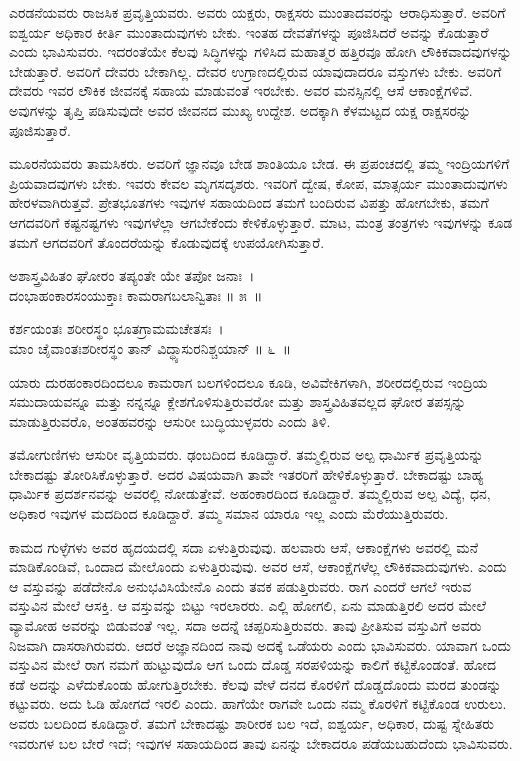ಎರಡನೆಯವರು ರಾಜಸಿಕ ಪ್ರವೃತ್ತಿಯವರು. ಅವರು ಯಕ್ಷರು, ರಾಕ್ಷಸರು ಮುಂತಾದವ\-ರನ್ನು ಆರಾಧಿಸುತ್ತಾರೆ. ಅವರಿಗೆ ಐಶ್ವರ್ಯ ಅಧಿಕಾರ ಕೀರ್ತಿ ಮುಂತಾದುವುಗಳು ಬೇಕು. ಇಂತಹ ದೇವತೆಗಳನ್ನು ಪೂಜಿಸಿದರೆ ಅವನ್ನು ಕೊಡುತ್ತಾರೆ ಎಂದು ಭಾವಿಸುವರು. ಇದರಂತೆಯೇ ಕೆಲವು ಸಿದ್ಧಿಗಳನ್ನು ಗಳಿಸಿದ ಮಹಾತ್ಮರ ಹತ್ತಿರವೂ ಹೋಗಿ ಲೌಕಿಕವಾದವುಗಳನ್ನು ಬೇಡುತ್ತಾರೆ. ಅವರಿಗೆ ದೇವರು ಬೇಕಾಗಿಲ್ಲ. ದೇವರ ಉಗ್ರಾಣದಲ್ಲಿರುವ ಯಾವುದಾದರೂ ವಸ್ತುಗಳು ಬೇಕು. ಅವರಿಗೆ ದೇವರು ಇವರ ಲೌಕಿಕ ಜೀವನಕ್ಕೆ ಸಹಾಯ ಮಾಡುವಂತೆ ಇರಬೇಕು. ಅವರ ಮನಸ್ಸಿನಲ್ಲಿ ಆಸೆ ಆಕಾಂಕ್ಷೆಗಳಿವೆ. ಅವುಗಳನ್ನು ತೃಪ್ತಿ ಪಡಿಸುವುದೇ ಅವರ ಜೀವನದ ಮುಖ್ಯ ಉದ್ದೇಶ. ಅದಕ್ಕಾಗಿ ಕೆಳಮಟ್ಟದ ಯಕ್ಷ ರಾಕ್ಷಸರನ್ನು ಪೂಜಿಸುತ್ತಾರೆ.

ಮೂರನೆಯವರು ತಾಮಸಿಕರು. ಅವರಿಗೆ ಜ್ಞಾನವೂ ಬೇಡ ಶಾಂತಿಯೂ ಬೇಡ. ಈ ಪ್ರಪಂಚದಲ್ಲಿ ತಮ್ಮ ಇಂದ್ರಿಯಗಳಿಗೆ ಪ್ರಿಯವಾದವುಗಳು ಬೇಕು. ಇವರು ಕೇವಲ ಮೃಗಸದೃಶರು. ಇವರಿಗೆ ದ್ವೇಷ, ಕೋಪ, ಮಾತ್ಸರ್ಯ ಮುಂತಾದುವುಗಳು ಹೇರಳವಾಗಿರುತ್ತವೆ. ಪ್ರೇತಭೂತಗಳು ಇವುಗಳ ಸಹಾಯದಿಂದ ತಮಗೆ ಬಂದಿರುವ ವಿಪತ್ತು ಹೋಗಬೇಕು, ತಮಗೆ ಆಗದವರಿಗೆ ಕಷ್ಟನಷ್ಟಗಳು ಇವುಗಳೆಲ್ಲಾ ಆಗಬೇಕೆಂದು ಕೇಳಿಕೊಳ್ಳುತ್ತಾರೆ. ಮಾಟ, ಮಂತ್ರ ತಂತ್ರಗಳು ಇವುಗಳನ್ನು ಕೂಡ ತಮಗೆ ಆಗದವರಿಗೆ ತೊಂದರೆಯನ್ನು ಕೊಡುವುದಕ್ಕೆ ಉಪಯೋಗಿಸುತ್ತಾರೆ.

\begin{shloka}
ಅಶಾಸ್ತ್ರವಿಹಿತಂ ಘೋರಂ ತಪ್ಯಂತೇ ಯೇ ತಪೋ ಜನಾಃ~।\\ದಂಭಾಹಂಕಾರಸಂಯುಕ್ತಾಃ ಕಾಮರಾಗಬಲಾನ್ವಿತಾಃ \hfill॥ ೫~॥
\end{shloka}

\begin{shloka}
ಕರ್ಶಯಂತಃ ಶರೀರಸ್ಥಂ ಭೂತಗ್ರಾಮಮಚೇತಸಃ~।\\ಮಾಂ ಚೈವಾಂತಃಶರೀರಸ್ಥಂ ತಾನ್ ವಿದ್ಧ್ಯಾಸುರನಿಶ್ಚಯಾನ್ \hfill॥ ೬~॥
\end{shloka}

\begin{artha}
ಯಾರು ದುರಹಂಕಾರದಿಂದಲೂ ಕಾಮರಾಗ ಬಲಗಳಿಂದಲೂ ಕೂಡಿ, ಅವಿವೇಕಿಗಳಾಗಿ, ಶರೀರದಲ್ಲಿರುವ ಇಂದ್ರಿಯ ಸಮುದಾಯವನ್ನೂ ಮತ್ತು ನನ್ನನ್ನೂ ಕ್ಲೇಶಗೊಳಿಸುತ್ತಿರುವರೋ ಮತ್ತು ಶಾಸ್ತ್ರವಿಹಿತವಲ್ಲದ ಘೋರ ತಪಸ್ಸನ್ನು ಮಾಡುತ್ತಿರುವರೊ, ಅಂತಹವರನ್ನು ಆಸುರೀ ಬುದ್ಧಿಯುಳ್ಳವರು ಎಂದು ತಿಳಿ.
\end{artha}

ತಮೋಗುಣಿಗಳು ಆಸುರೀ ವೃತ್ತಿಯವರು. ಢಂಬದಿಂದ ಕೂಡಿದ್ದಾರೆ. ತಮ್ಮಲ್ಲಿರುವ ಅಲ್ಪ ಧಾರ್ಮಿಕ ಪ್ರವೃತ್ತಿಯನ್ನು ಬೇಕಾದಷ್ಟು ತೋರಿಸಿಕೊಳ್ಳುತ್ತಾರೆ. ಅದರ ವಿಷಯವಾಗಿ ತಾವೇ ಇತರರಿಗೆ ಹೇಳಿಕೊಳ್ಳುತ್ತಾರೆ. ಬೇಕಾದಷ್ಟು ಬಾಹ್ಯ ಧಾರ್ಮಿಕ ಪ್ರದರ್ಶನವನ್ನು ಅವರಲ್ಲಿ ನೋಡುತ್ತೇವೆ. ಅಹಂಕಾರದಿಂದ ಕೂಡಿದ್ದಾರೆ. ತಮ್ಮಲ್ಲಿರುವ ಅಲ್ಪ ವಿದ್ಯೆ, ಧನ, ಅಧಿಕಾರ ಇವುಗಳ ಮದದಿಂದ ಕೂಡಿದ್ದಾರೆ. ತಮ್ಮ ಸಮಾನ ಯಾರೂ ಇಲ್ಲ ಎಂದು ಮೆರೆಯುತ್ತಿರುವರು.

ಕಾಮದ ಗುಳ್ಳೆಗಳು ಅವರ ಹೃದಯದಲ್ಲಿ ಸದಾ ಏಳುತ್ತಿರುವುವು. ಹಲವಾರು ಆಸೆ, ಆಕಾಂಕ್ಷೆಗಳು ಅವರಲ್ಲಿ ಮನೆ ಮಾಡಿಕೊಂಡಿವೆ, ಒಂದಾದ ಮೇಲೊಂದು ಏಳುತ್ತಿರುವುವು. ಅವರ ಆಸೆ, ಆಕಾಂಕ್ಷೆಗಳೆಲ್ಲ ಲೌಕಿಕವಾದುವುಗಳು. ಎಂದು ಆ ವಸ್ತುವನ್ನು ಪಡೆದೇನೊ ಅನುಭವಿಸಿಯೇನೊ ಎಂದು ತವಕ ಪಡುತ್ತಿರುವರು. ರಾಗ ಎಂದರೆ ಆಗಲೆ ಇರುವ ವಸ್ತುವಿನ ಮೇಲೆ ಆಸಕ್ತಿ. ಆ ವಸ್ತುವನ್ನು ಬಿಟ್ಟು ಇರಲಾರರು. ಎಲ್ಲಿ ಹೋಗಲಿ, ಏನು ಮಾಡುತ್ತಿರಲಿ ಅದರ ಮೇಲೆ ವ್ಯಾಮೋಹ ಅವರನ್ನು ಬಿಡುವಂತೆ ಇಲ್ಲ. ಸದಾ ಅದನ್ನೆ ಚಪ್ಪರಿಸುತ್ತಿರುವರು. ತಾವು ಪ್ರೀತಿಸುವ ವಸ್ತುವಿಗೆ ಅವರು ನಿಜವಾಗಿ ದಾಸರಾಗಿರುವರು. ಆದರೆ ಅಜ್ಞಾನದಿಂದ ನಾವು ಅದಕ್ಕೆ ಒಡೆಯರು ಎಂದು ಭಾವಿಸುವರು. ಯಾವಾಗ ಒಂದು ವಸ್ತುವಿನ ಮೇಲೆ ರಾಗ ನಮಗೆ ಹುಟ್ಟುವುದೊ ಆಗ ಒಂದು ದೊಡ್ಡ ಸರಪಳಿಯನ್ನು ಕಾಲಿಗೆ ಕಟ್ಟಿಕೊಂಡಂತೆ. ಹೋದ ಕಡೆ ಅದನ್ನು ಎಳೆದುಕೊಂಡು ಹೋಗುತ್ತಿರಬೇಕು. ಕೆಲವು ವೇಳೆ ದನದ ಕೊರಳಿಗೆ ದೊಡ್ಡದೊಂದು ಮರದ ತುಂಡನ್ನು ಕಟ್ಟುವರು. ಅದು ಓಡಿ ಹೋಗದೆ ಇರಲಿ ಎಂದು. ಹಾಗೆಯೇ ರಾಗವೇ ಒಂದು ನಮ್ಮ ಕೊರಳಿಗೆ ಕಟ್ಟಿಕೊಂಡ ಉರುಲು. ಅವರು ಬಲದಿಂದ ಕೂಡಿದ್ದಾರೆ. ತಮಗೆ ಬೇಕಾದಷ್ಟು ಶಾರೀರಕ ಬಲ ಇದೆ, ಐಶ್ವರ್ಯ, ಅಧಿಕಾರ, ದುಷ್ಟ ಸ್ನೇಹಿತರು ಇವರುಗಳ ಬಲ ಬೇರೆ ಇದೆ; ಇವುಗಳ ಸಹಾಯದಿಂದ ತಾವು ಏನನ್ನು ಬೇಕಾದರೂ ಪಡೆಯಬಹುದೆಂದು ಭಾವಿಸುವರು.

